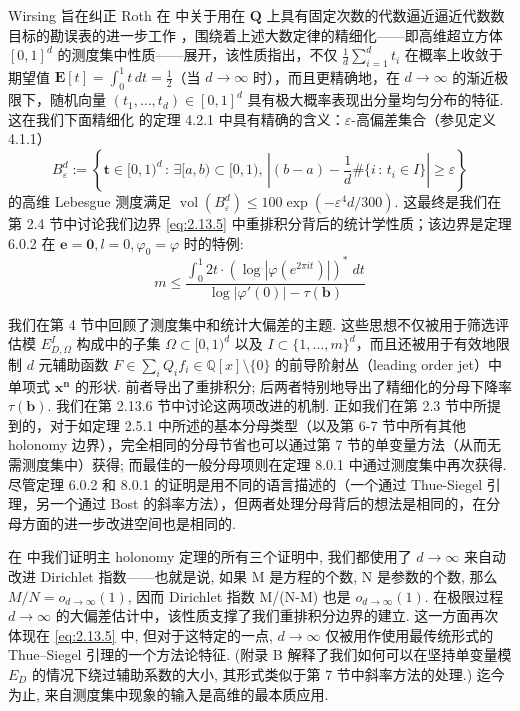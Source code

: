 Wirsing 旨在纠正 Roth 在 \cite{Rot55} 中关于用在 $\mathbf{Q}$ 上具有固定次数的代数逼近逼近代数数目标的勘误表的进一步工作 \cite[参见第 4.2 节]{Wir71}，围绕着上述大数定律的精细化——即高维超立方体 $[0,1]^d$ 的测度集中性质——展开，该性质指出，不仅 $\frac{1}{d}\sum_{i=1}^d t_i$ 在概率上收敛于期望值 $\mathbf{E}[t] = \int_0^1 t \, dt = \frac{1}{2}$（当 $d \to \infty$ 时），而且更精确地，在 $d \to \infty$ 的渐近极限下，随机向量 $(t_1, \ldots, t_d) \in [0, 1]^d$ 具有极大概率表现出分量均匀分布的特征. 这在我们下面精细化 \cite[Lemma 13]{Wir71} 的定理 4.2.1 中具有精确的含义：$\varepsilon$-高偏差集合（参见定义 4.1.1）
\[ B_\varepsilon^d := \left\{ \mathbf{t} \in [0,1)^d \, : \, \exists [a,b) \subset [0,1), \, \left| (b-a) - \frac{1}{d} \# \{i \, : \, t_i \in I\} \right| \geq \varepsilon \right\} \]
的高维 Lebesgue 测度满足 $\operatorname{vol}(B_{\varepsilon}^d) \leq 100 \exp\left(-\varepsilon^4 d/300\right)$. 这最终是我们在第 2.4 节中讨论我们边界 \eqref{eq:2.13.5} 中重排积分背后的统计学性质；该边界是定理 6.0.2 在 $\mathbf{e} = \mathbf{0}, l = 0, \varphi_0 = \varphi$ 时的特例:
\begin{equation}\label{eq:2.13.5}
m \le \frac{\int_0^1 2t \cdot (\log |\varphi(e^{2\pi it})|)^*\;dt}{\log |\varphi'(0)| - \tau(\mathbf{b})}
\end{equation}

我们在第 4 节中回顾了测度集中和统计大偏差的主题. 这些思想不仅被用于筛选评估模 $E_{D,\Omega}^I$ 构成中的子集 $\Omega \subset [0,1)^d$ 以及 $I \subset \{1,\ldots,m\}^d$，而且还被用于有效地限制 $d$ 元辅助函数 $F \in \sum_{i} Q_{i} f_{i} \in \mathbb{Q}[x] \setminus \{0\}$ 的前导阶射丛（leading order jet）中单项式 $\mathbf{x^n}$ 的形状. 前者导出了重排积分; 后两者特别地导出了精细化的分母下降率 $\tau(\mathbf{b})$. 我们在第 2.13.6 节中讨论这两项改进的机制. 正如我们在第 2.3 节中所提到的，对于如定理 2.5.1 中所述的基本分母类型（以及第 6-7 节中所有其他 holonomy 边界），完全相同的分母节省也可以通过第 7 节的单变量方法（从而无需测度集中）获得; 而最佳的一般分母项则在定理 8.0.1 中通过测度集中再次获得. 尽管定理 6.0.2 和 8.0.1 的证明是用不同的语言描述的（一个通过 Thue-Siegel 引理，另一个通过 Bost 的斜率方法），但两者处理分母背后的想法是相同的，在分母方面的进一步改进空间也是相同的.

在 \cite{CDT21} 中我们证明主 holonomy 定理的所有三个证明中, 我们都使用了 $d \to \infty$ 来自动改进 Dirichlet 指数——也就是说, 如果 M 是方程的个数, N 是参数的个数, 那么 \(M/N = o_{d\to\infty}(1)\), 因而 Dirichlet 指数 M/(N-M) 也是 \(o_{d\to\infty}(1)\). 
在极限过程 \(d \to \infty\) 的大偏差估计中，该性质支撑了我们重排积分边界的建立. 这一方面再次体现在 \eqref{eq:2.13.5} 中, 但对于这特定的一点, \(d\to\infty\) 仅被用作使用最传统形式的 Thue--Siegel 引理的一个方法论特征. (附录 B 解释了我们如何可以在坚持单变量模 \(E_D\) 的情况下绕过辅助系数的大小, 其形式类似于第 7 节中斜率方法的处理.) 迄今为止, 来自测度集中现象的输入是高维的最本质应用.

